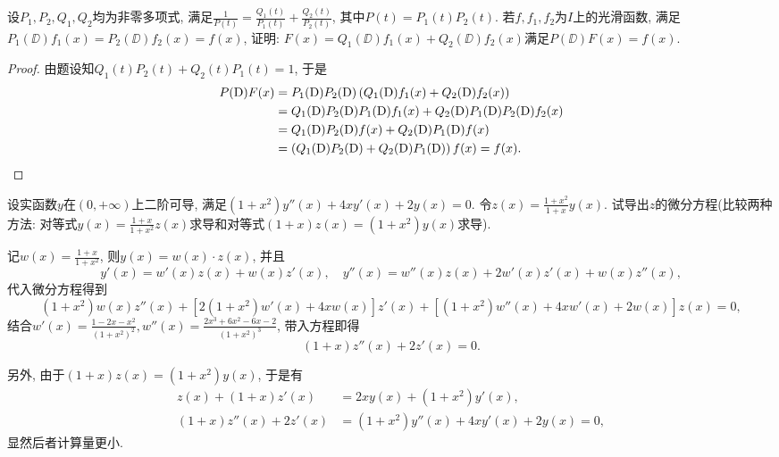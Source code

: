 \begin{quizb}
\woe 设\(P_1,P_2,Q_1,Q_2\)均为非零多项式, 满足\(\frac{1}{P(t)}=\frac{Q_1(t)}{P_1(t)}+\frac{Q_2(t)}{P_2(t)}\), 其中\(P(t)=P_1(t)P_2(t)\). 若\(f,f_1,f_2\)为\(I\)上的光滑函数, 满足\(P_1(\DD)f_1(x)=P_2(\DD)f_2(x)=f(x)\), 证明: \(F(x)=Q_1(\DD)f_1(x)+Q_2(\DD)f_2(x)\)满足\(P(\DD)F(x)=f(x)\).
\begin{proof}
由题设知\(Q_1(t)P_2(t)+Q_2(t)P_1(t)=1\), 于是\[\begin{split}
P(\mathrm{D})F(x)&=P_1(\mathrm{D})P_2(\mathrm{D})\left(Q_1(\mathrm{D})f_1(x)+Q_2(\mathrm{D})f_2(x)\right)\\&=Q_1(\mathrm{D})P_2(\mathrm{D})P_1(\mathrm{D})f_1(x)+Q_2(\mathrm{D})P_1(\mathrm{D})P_2(\mathrm{D})f_2(x)\\&=Q_1(\mathrm{D})P_2(\mathrm{D})f(x)+Q_2(\mathrm{D})P_1(\mathrm{D})f(x)\\&=\left(Q_1(\mathrm{D})P_2(\mathrm{D})+Q_2(\mathrm{D})P_1(\mathrm{D})\right)f(x)=f(x).\qedhere
\end{split}\]
\end{proof}
\woe 设实函数\(y\)在\((0,+\infty)\)上二阶可导, 满足\((1+x^2)y''(x)+4xy'(x)+2y(x)=0.\) 令\(z(x)=\frac{1+x^2}{1+x}y(x)\). 试导出\(z\)的微分方程(比较两种方法: 对等式\(y(x)=\frac{1+x}{1+x^2}z(x)\)求导和对等式\((1+x)z(x)=(1+x^2)y(x)\)求导).
\begin{solution}
记\(w(x)=\frac{1+x}{1+x^2}\), 则\(y(x)=w(x)\cdot z(x)\), 并且\[y'(x)=w'(x)z(x)+w(x)z'(x),\quad y''(x)=w''(x)z(x)+2w'(x)z'(x)+w(x)z''(x),\]代入微分方程得到\[(1+x^2)w(x)z''(x)+\left[2(1+x^2)w'(x)+4xw(x)\right]z'(x)+\left[(1+x^2)w''(x)+4xw'(x)+2w(x)\right]z(x)=0,\]
结合\(w'(x)=\frac{1-2x-x^2}{(1+x^2)^2},w''(x)=\frac{2x^3+6x^2-6x-2}{(1+x^2)^3}\), 带入方程即得\[(1+x)z''(x)+2z'(x)=0.\]

另外, 由于\((1+x)z(x)=(1+x^2)y(x)\), 于是有\[\begin{split}
z(x)+(1+x)z'(x)&=2xy(x)+(1+x^2)y'(x),\\
(1+x)z''(x)+2z'(x)&=(1+x^2)y''(x)+4xy'(x)+2y(x)=0,
\end{split}\]显然后者计算量更小.
\end{solution}
\end{quizb}
